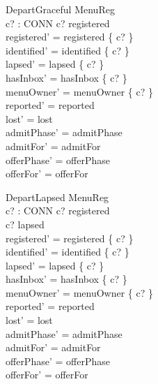 \documentclass[a4paper,10pt,fleqn]{article}
\begin{document}
\begin{schema}{DepartGraceful}
  \Delta MenuReg \\
  c? : CONN
\where
  c? \in registered \\
  registered' = registered \setminus \{ c? \} \\
  identified' = identified \setminus \{ c? \} \\
  lapsed' = lapsed \setminus \{ c? \} \\
  hasInbox' = hasInbox \setminus \{ c? \} \\
  menuOwner' = menuOwner \setminus \{ c? \} \\
  reported' = reported \\
  lost' = lost \\
  admitPhase' = admitPhase \\
  admitFor' = admitFor \\
  offerPhase' = offerPhase \\
  offerFor' = offerFor
\end{schema}

\begin{schema}{DepartLapsed}
  \Delta MenuReg \\
  c? : CONN
\where
  c? \in registered \\
  c? \in lapsed \\
  registered' = registered \setminus \{ c? \} \\
  identified' = identified \setminus \{ c? \} \\
  lapsed' = lapsed \setminus \{ c? \} \\
  hasInbox' = hasInbox \setminus \{ c? \} \\
  menuOwner' = menuOwner \setminus \{ c? \} \\
  reported' = reported \\
  lost' = lost \\
  admitPhase' = admitPhase \\
  admitFor' = admitFor \\
  offerPhase' = offerPhase \\
  offerFor' = offerFor
\end{schema}

\end{document}
